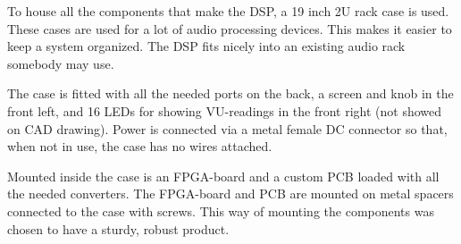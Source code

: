 To house all the components that make the DSP, a 19 inch 2U rack case is used. These cases are used for a lot of audio processing devices. This makes it easier to keep a system organized. The DSP fits nicely into an existing audio rack somebody may use.
\par 
\noindent The case is fitted with all the needed ports on the back, a screen and knob in the front left, and 16 LEDs for showing VU-readings in the front right (not showed on CAD drawing). Power is connected via a metal female DC connector so that, when not in use, the case has no wires attached. 
\par
\noindent Mounted inside the case is an FPGA-board and a custom PCB loaded with all the needed converters. The FPGA-board and PCB are mounted on metal spacers connected to the case with screws. This way of mounting the components was chosen to have a sturdy, robust product.
